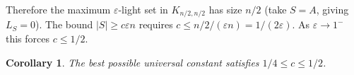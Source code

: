 \documentclass[12pt]{article}
\newtheorem{corollary}[theorem]{Corollary}
\theoremstyle{definition}
\theoremstyle{remark}
\begin{document}
Therefore the maximum $\varepsilon$-light set in $K_{n/2,n/2}$ has size $n/2$ (take
$S = A$, giving $L_S = 0$).  The bound $|S| \ge c\varepsilon n$ requires
$c \le n/2 / (\varepsilon n) = 1/(2\varepsilon)$.  As $\varepsilon \to 1^-$ this forces
$c \le 1/2$.

\begin{corollary}
The best possible universal constant satisfies $1/4 \le c \le 1/2$.
\end{corollary}
\end{document}
